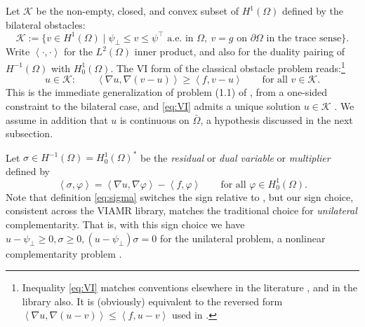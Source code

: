 \documentclass[12pt]{amsart}
\numberwithin{equation}{section}
\theoremstyle{plain}
\theoremstyle{definition}
\theoremstyle{remark}
\newcommand{\Om}{\Omega}
\newcommand{\dOm}{\partial\Omega}
\newcommand{\psilo}{\psi_\bot}
\newcommand{\psiup}{\psi^\top}
\begin{document}
Let $\mathcal{K}$ be the non-empty, closed, and convex subset of $H^1(\Om)$ defined by the bilateral obstacles:
\begin{equation}
\label{eq:K}
  \mathcal{K} := \{v \in H^1(\Om) \mid \psilo \le v \le \psiup \text{ a.e.\ in } \Om,
    \ v = g \text{ on } \dOm \text{ in the trace sense}\}.
\end{equation}
Write $\left<\cdot,\cdot\right>$ for the $L^2(\Om)$ inner product, and also for the duality pairing of $H^{-1}(\Om)$ with $H_0^1(\Om)$.  The VI form of the classical obstacle problem reads:\footnote{Inequality \eqref{eq:VI} matches conventions elsewhere in the literature \cite{BuelerFarrell2024,Falk1974,GraeserKornhuber2009,KinderlehrerStampacchia1980}, and in the library also.  It is (obviously) equivalent to the reversed form $\left< \nabla u, \nabla(u - v)\right> \le \left< f, u - v\right>$ used in \cite[formula (1.1)]{NSV03}.}
\begin{equation}
\label{eq:VI}
  u \in \mathcal{K}: \qquad
  \left< \nabla u, \nabla(v - u)\right> \ge \left< f, v - u\right>
  \qquad \text{for all } v \in \mathcal{K}.
\end{equation}
This is the immediate generalization of problem (1.1) of \cite{NSV03}, from a one-sided constraint to the bilateral case, and \eqref{eq:VI} admits a unique solution $u \in \mathcal{K}$ \cite[Theorem 6.2]{KinderlehrerStampacchia1980}.  We assume in addition that $u$ is continuous on $\bar\Om$, a hypothesis discussed in the next subsection.

Let $\sigma \in H^{-1}(\Om) = H_0^1(\Om)^*$ be the \emph{residual} or \emph{dual variable} or \emph{multiplier} defined by
\begin{equation}
\label{eq:sigma}
  \left< \sigma, \varphi\right> = \left< \nabla u, \nabla \varphi\right> - \left< f, \varphi\right>
  \qquad \text{for all } \varphi \in H_0^1(\Om).
\end{equation}
Note that definition \eqref{eq:sigma} switches the sign relative to \cite[formula (1.2)]{NSV03}, but our sign choice, consistent across the VIAMR library, matches the traditional choice for \emph{unilateral} complementarity.  That is, with this sign choice we have $u-\psilo\ge 0, \sigma\ge 0, (u-\psilo) \sigma = 0$ for the unilateral problem, a nonlinear complementarity problem \cite{FacchineiPang2003}.
\end{document}
